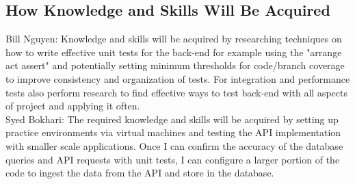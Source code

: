 \documentclass[12pt, titlepage]{article}
\begin{document}
\subsection{How Knowledge and Skills Will Be Acquired}

\noindent Bill Nguyen: Knowledge and skills will be acquired by researching techniques on how to write effective unit tests for the back-end for example using the "arrange act assert" and potentially setting minimum thresholds for code/branch coverage to improve consistency and organization of tests. For integration and performance tests also perform research to find effective ways to test back-end with all aspects of project and applying it often.\\

\noindent Syed Bokhari: The required knowledge and skills will be acquired by setting up practice environments via virtual machines and testing the API implementation with smaller scale applications. Once I can confirm the accuracy of the database queries and API requests with unit tests, I can configure a larger portion of the code to ingest the data from the API and store in the database.\\
\end{document}
